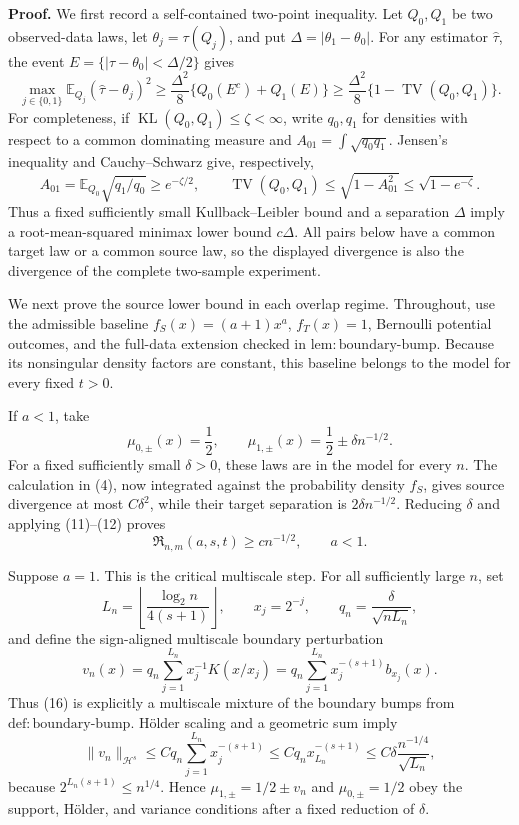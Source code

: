 \textbf{Proof.}
We first record a self-contained two-point inequality. Let \(Q_0,Q_1\) be two observed-data laws, let \(\theta_j=\tau(Q_j)\), and put \(\Delta=|\theta_1-\theta_0|\). For any estimator \(\widehat\tau\), the event \(E=\{|\widehat\tau-\theta_0|<\Delta/2\}\) gives
\[
\max_{j\in\{0,1\}}\mathbb E_{Q_j}(\widehat\tau-\theta_j)^2
\ge \frac{\Delta^2}{8}
 \{Q_0(E^c)+Q_1(E)\}
\ge \frac{\Delta^2}{8}\{1-\operatorname{TV}(Q_0,Q_1)\}.
\tag{11}
\]
For completeness, if \(\operatorname{KL}(Q_0,Q_1)\le\zeta<\infty\), write \(q_0,q_1\) for densities with respect to a common dominating measure and \(A_{01}=\int\sqrt{q_0q_1}\). Jensen's inequality and Cauchy--Schwarz give, respectively,
\[
A_{01}=\mathbb E_{Q_0}\sqrt{q_1/q_0}\ge e^{-\zeta/2},
\qquad
\operatorname{TV}(Q_0,Q_1)
\le\sqrt{1-A_{01}^2}
\le\sqrt{1-e^{-\zeta}}.
\tag{12}
\]
Thus a fixed sufficiently small Kullback--Leibler bound and a separation \(\Delta\) imply a root-mean-squared minimax lower bound \(c\Delta\). All pairs below have a common target law or a common source law, so the displayed divergence is also the divergence of the complete two-sample experiment.

We next prove the source lower bound in each overlap regime. Throughout, use the admissible baseline \(f_S(x)=(a+1)x^a\), \(f_T(x)=1\), Bernoulli potential outcomes, and the full-data extension checked in \(\mathrm{lem:boundary\text{-}bump}\). Because its nonsingular density factors are constant, this baseline belongs to the model for every fixed \(t>0\).

If \(a<1\), take
\[
\mu_{0,\pm}(x)=\frac12,
\qquad
\mu_{1,\pm}(x)=\frac12\pm\delta n^{-1/2}.
\tag{13}
\]
For a fixed sufficiently small \(\delta>0\), these laws are in the model for every \(n\). The calculation in (4), now integrated against the probability density \(f_S\), gives source divergence at most \(C\delta^2\), while their target separation is \(2\delta n^{-1/2}\). Reducing \(\delta\) and applying (11)--(12) proves
\[
\mathfrak R_{n,m}(a,s,t)\ge c n^{-1/2},
\qquad a<1.
\tag{14}
\]

Suppose \(a=1\). This is the critical multiscale step. For all sufficiently large \(n\), set
\[
L_n=\left\lfloor\frac{\log_2 n}{4(s+1)}\right\rfloor,
\qquad x_j=2^{-j},
\qquad q_n=\frac{\delta}{\sqrt{nL_n}},
\tag{15}
\]
and define the sign-aligned multiscale boundary perturbation
\[
v_n(x)=q_n\sum_{j=1}^{L_n}x_j^{-1}K(x/x_j)
=q_n\sum_{j=1}^{L_n}x_j^{-(s+1)}b_{x_j}(x).
\tag{16}
\]
Thus (16) is explicitly a multiscale mixture of the boundary bumps from \(\mathrm{def:boundary\text{-}bump}\). Hölder scaling and a geometric sum imply
\[
\|v_n\|_{\mathcal H^s}
\le Cq_n\sum_{j=1}^{L_n}x_j^{-(s+1)}
\le Cq_nx_{L_n}^{-(s+1)}
\le C\delta\frac{n^{-1/4}}{\sqrt{L_n}},
\tag{17}
\]
because \(2^{L_n(s+1)}\le n^{1/4}\). Hence \(\mu_{1,\pm}=1/2\pm v_n\) and \(\mu_{0,\pm}=1/2\) obey the support, Hölder, and variance conditions after a fixed reduction of \(\delta\).

